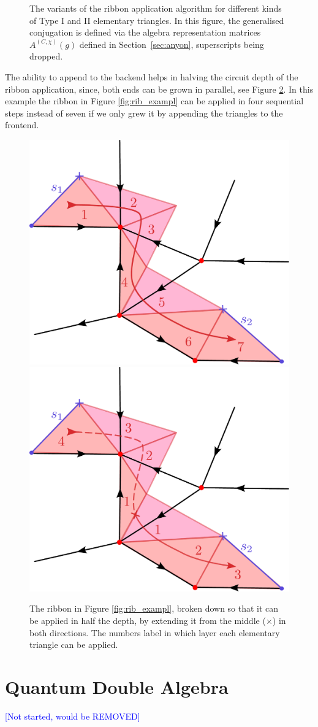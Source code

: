 \documentclass[two column]{article}
\newcommand{\jovan}[1]{\textcolor{blue}{[#1]}}
\begin{document}
\begin{figure}
\begin{tabular}{llll}
\end{tabular}\vspace{10pt}
\caption{The variants of the ribbon application algorithm for different kinds of Type I and II elementary triangles. In this figure, the generalised conjugation is defined via the algebra representation matrices $A^{(C,\chi)}(g)$ defined in Section~\ref{sec:anyon}, superscripts being dropped.}
\label{fig:al_trigs}
\end{figure}

The ability to append to the backend helps in halving the circuit depth of the ribbon application, since, both ends can be grown in parallel, see Figure \ref{fig:both_ends}. In this example the ribbon in Figure \ref{fig:rib_exampl} can be applied in four sequential steps instead of seven if we only grew it by appending the triangles to the frontend.
\begin{figure}
	\centering
	\includegraphics[width=0.45\linewidth]{Figures/front_end.pdf}
	\includegraphics[width=0.45\linewidth]{Figures/both_ends.pdf}
	\caption{The ribbon in Figure \ref{fig:rib_exampl}, broken down so that it can be applied in half the depth, by extending it from the middle ($\times$) in both directions. The numbers label in which layer each elementary triangle can be applied.}
	\label{fig:both_ends}
\end{figure}


\section{Quantum Double Algebra}
\jovan{Not started, would be REMOVED}
\end{document}
